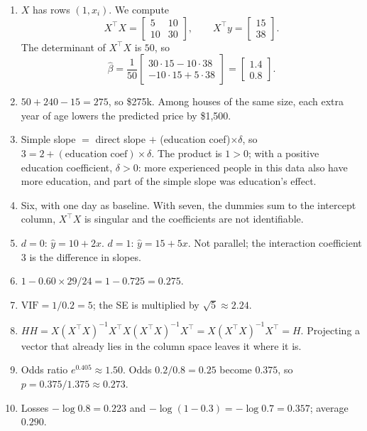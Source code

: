 \begin{enumerate}
  \item $X$ has rows $(1, x_i)$. We compute
  \[
    X^\top X = \begin{bmatrix}5&10\\10&30\end{bmatrix}, \qquad
    X^\top y = \begin{bmatrix} 15\\ 38 \end{bmatrix}.
  \]
  The determinant of $X^\top X$ is $50$, so
  \[
    \hat\beta = \frac{1}{50}\begin{bmatrix} 30\cdot 15 - 10\cdot 38\\ -10\cdot 15 + 5\cdot 38 \end{bmatrix} = \begin{bmatrix} 1.4\\ 0.8 \end{bmatrix}.
  \]
  \item $50 + 240 - 15 = 275$, so \$275k. Among houses of the same size, each extra year
  of age lowers the predicted price by \$1{,}500.
  \item Simple slope $=$ direct slope $+$ (education coef)$\times\delta$, so
  $3 = 2 + (\text{education coef})\times\delta$. The product is $1 > 0$; with a positive
  education coefficient, $\delta > 0$: more experienced people in this data also have more
  education, and part of the simple slope was education's effect.
  \item Six, with one day as baseline. With seven, the dummies sum to the intercept column,
  $X^\top X$ is singular and the coefficients are not identifiable.
  \item $d = 0$: $\hat y = 10 + 2x$. $d = 1$: $\hat y = 15 + 5x$. Not parallel; the
  interaction coefficient $3$ is the difference in slopes.
  \item $1 - 0.60\times 29/24 = 1 - 0.725 = 0.275$.
  \item $\text{VIF} = 1/0.2 = 5$; the SE is multiplied by $\sqrt5 \approx 2.24$.
  \item $HH = X(X^\top X)^{-1}X^\top X(X^\top X)^{-1}X^\top = X(X^\top X)^{-1}X^\top = H$.
  Projecting a vector that already lies in the column space leaves it where it is.
  \item Odds ratio $e^{0.405} \approx 1.50$. Odds $0.2/0.8 = 0.25$ become $0.375$, so
  $p = 0.375/1.375 \approx 0.273$.
  \item Losses $-\log 0.8 = 0.223$ and $-\log(1-0.3) = -\log 0.7 = 0.357$; average
  $0.290$.
\end{enumerate}
